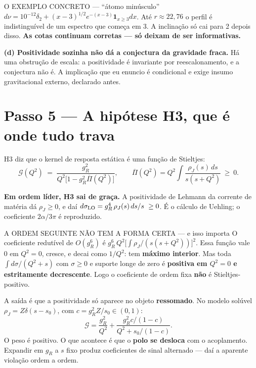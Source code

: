\documentclass[11pt,a4paper]{article}
\begin{document}
\begin{caixa}{O EXEMPLO CONCRETO --- ``átomo minúsculo''}
$d\nu=10^{-12}\delta_2+(x-3)^{1/2}e^{-(x-3)}\mathbf{1}_{x\ge3}dx$.
Até $r\approx 22{,}76$ o perfil é indistinguível de um espectro que começa em 3.
A inclinação só cai para 2 depois disso.
\textbf{As cotas continuam corretas --- só deixam de ser informativas.}
\end{caixa}

\textbf{(d) Positividade sozinha não dá a conjectura da gravidade fraca.}
Há uma obstrução de escala: a positividade é invariante por reescalonamento, e
a conjectura não é. A implicação que eu enuncio é condicional e exige insumo
gravitacional externo, declarado antes.

\section*{Passo 5 --- A hipótese H3, que é onde tudo trava}

H3 diz que o kernel de resposta estática é uma função de Stieltjes:
\[
  \mathcal{G}(Q^2)\;=\;\frac{g_R^2}{Q^2\bigl[1-g_R^2\overline{\Pi}(Q^2)\bigr]},
  \qquad
  \overline{\Pi}(Q^2)=Q^2\!\int\!\frac{\rho_J(s)\,ds}{s(s+Q^2)}\ \ge\ 0 .
\]

\textbf{Em ordem líder, H3 sai de graça.} A positividade de Lehmann da corrente
de matéria dá $\rho_J\ge0$, e daí
$d\sigma_{\rm LO}=g_R^4\,\rho_J(s)\,ds/s\ \ge 0$. É o cálculo de Uehling; o
coeficiente $2\alpha/3\pi$ é reproduzido.

\begin{alerta}{A ORDEM SEGUINTE NÃO TEM A FORMA CERTA --- e isso importa}
O coeficiente redutível de $O(g_R^6)$ é
$g_R^6\,Q^2\bigl[\int\rho_J/(s(s+Q^2))\bigr]^2$. Essa função vale $0$ em
$Q^2=0$, cresce, e decai como $1/Q^2$: tem \textbf{máximo interior}.
Mas toda $\int d\sigma/(Q^2+s)$ com $\sigma\ge0$ e suporte longe de zero é
\textbf{positiva em $Q^2=0$ e estritamente decrescente}.
Logo o coeficiente de ordem fixa \textbf{não} é Stieltjes-positivo.
\end{alerta}

A saída é que a positividade só aparece no objeto \textbf{ressomado}. No modelo
solúvel $\rho_J=Z\delta(s-s_0)$, com $c=g_R^2Z/s_0\in(0,1)$:
\[
  \mathcal{G}=\frac{g_R^2}{Q^2}
   +\frac{g_R^2c/(1-c)}{Q^2+s_0/(1-c)} .
\]
O peso é positivo. O que acontece é que o \textbf{polo se desloca} com o
acoplamento. Expandir em $g_R$ a $s$ fixo produz coeficientes de sinal
alternado --- daí a aparente violação ordem a ordem.
\end{document}
